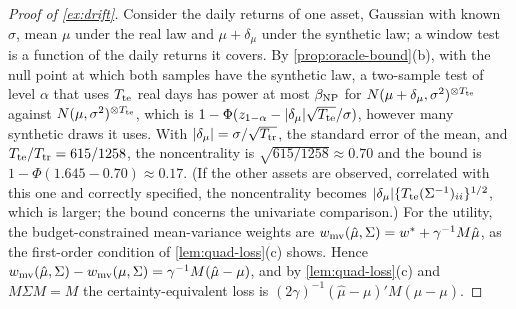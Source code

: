 \begin{proof}[Proof of \cref{ex:drift}]
Consider the daily returns of one asset, \iid{} Gaussian with known $\sigma$, mean $\mu$ under the
real law and $\mu+\delta_\mu$ under the synthetic law; a window test is a function of the daily
returns it covers. By \cref{prop:oracle-bound}(b), with the null point at which both samples have
the synthetic law, a two-sample test of level $\alpha$ that uses $T_{\mathrm{te}}$ real days has power at
most $\beta_{\mathrm{NP}}$ for $N(\mu+\delta_\mu,\sigma^2)^{\otimes T_{\mathrm{te}}}$ against $N(\mu,\sigma^2)^{\otimes T_{\mathrm{te}}}$,
which is $1-\Phi(z_{1-\alpha}-\lvert\delta_\mu\rvert\sqrt{T_{\mathrm{te}}}/\sigma)$, however many synthetic draws it
uses. With $\lvert\delta_\mu\rvert=\sigma/\sqrt{T_{\mathrm{tr}}}$, the standard error of the \TRAIN{} mean, and
$T_{\mathrm{te}}/T_{\mathrm{tr}}=615/1258$, the noncentrality is $\sqrt{615/1258}\approx0.70$ and the bound is
$1-\Phi(1.645-0.70)\approx0.17$. (If the other assets are observed, correlated with this one and
correctly specified, the noncentrality becomes $\lvert\delta_\mu\rvert\{T_{\mathrm{te}}(\Sigma^{-1})_{ii}\}^{1/2}$,
which is larger; the bound concerns the univariate comparison.) For the utility, the
budget-constrained mean-variance weights are
$w_{\mathrm{mv}}(\hat\mu,\Sigma)=w^*+\gamma^{-1}M\hat\mu$, as the first-order condition of
\cref{lem:quad-loss}(c) shows. Hence $w_{\mathrm{mv}}(\hat\mu,\Sigma)-w_{\mathrm{mv}}(\mu,\Sigma)=\gamma^{-1}M(\hat\mu-\mu)$,
and by \cref{lem:quad-loss}(c) and $M\Sigma M=M$ the certainty-equivalent loss is
$(2\gamma)^{-1}(\hat\mu-\mu)'M(\hat\mu-\mu)$.
\end{proof}
